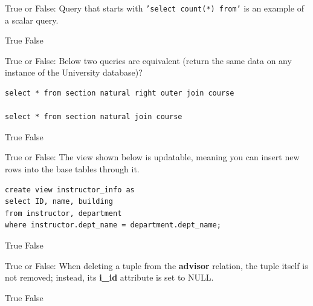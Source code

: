 \documentclass[12pt, addpoints]{exam}
\begin{document}
\begin{questions}
\begin{minipage}{\linewidth}
\question[1]
True or False: Query that starts with \texttt{'select count(*) from'} is an example of a scalar query.\par\vspace{0.5em}
\begin{checkboxes}
    \choice True
    \CorrectChoice False
\end{checkboxes}
\end{minipage}\vspace{1em}

\begin{minipage}{\linewidth}
\question[2]
True or False: Below two queries are equivalent (return the same data on any instance of the University database)?\par\vspace{0.5em}
\begin{verbatim}
select * from section natural right outer join course

select * from section natural join course
\end{verbatim}
\begin{checkboxes}
    \choice True
    \CorrectChoice False
\end{checkboxes}
\end{minipage}\vspace{1em}

\begin{minipage}{\linewidth}
\question[1]
True or False: The view shown below is updatable, meaning you can insert new rows into the base tables through it.\par\vspace{0.5em}
\begin{verbatim}
create view instructor_info as 
select ID, name, building 
from instructor, department 
where instructor.dept_name = department.dept_name;
\end{verbatim}
\begin{checkboxes}
    \choice True
    \CorrectChoice False
\end{checkboxes}
\end{minipage}\vspace{1em}

\begin{minipage}{\linewidth}
\question[1]
True or False: When deleting a tuple from the \textbf{advisor} relation, the tuple itself is not removed; instead, its \textbf{i\_id} attribute is set to NULL.\par\vspace{0.5em}
\begin{checkboxes}
    \choice True
    \CorrectChoice False
\end{checkboxes}
\end{minipage}\vspace{1em}


\end{questions}
\end{document}
